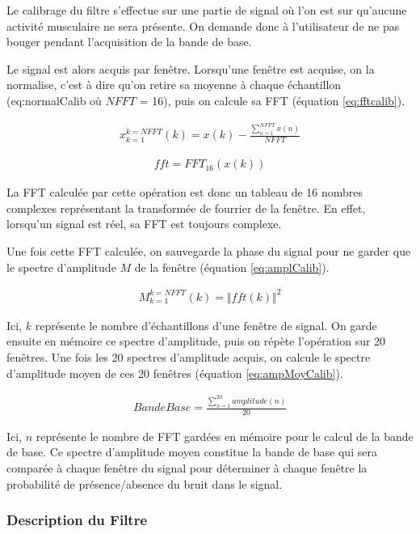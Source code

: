 \documentclass[letterpaper, twoside, 12pt, memoire, creativecommons, hyperref]{thETS}
\begin{document}
Le calibrage du filtre s'effectue sur une partie de signal où l'on est sur qu'aucune activité musculaire ne sera présente. On demande donc à l'utilisateur de ne pas bouger pendant l'acquisition de la bande de base. 

Le signal est alors acquis par fenêtre. Lorsqu'une fenêtre est acquise, on la normalise, c'est à dire qu'on retire sa moyenne à chaque échantillon (eq:normalCalib où $NFFT$ = 16), puis on calcule sa FFT (équation \ref{eq:fftcalib}).

\begin{align}\label{eq:normalCalib}
   x_{k=1}^{k=NFFT}(k) = x(k) - \frac{\sum_{n=1}^{NFFT}x(n)}{NFFT}
\end{align}

\begin{align}\label{eq:fftcalib}
   fft = FFT_{16}(x(k)) 
\end{align}

La FFT calculée par cette opération est donc un tableau de 16 nombres complexes représentant la transformée de fourrier de la fenêtre. En effet, lorsqu'un signal est réel, sa FFT est toujours complexe.

Une fois cette FFT calculée, on sauvegarde la phase du signal pour ne garder que le spectre d'amplitude $M$ de la fenêtre (équation \ref{eq:amplCalib}).

\begin{align}\label{eq:amplCalib}
   M_{k=1}^{k=NFFT}(k) = \Vert fft(k) \Vert^2
\end{align}

Ici, $k$ représente le nombre d'échantillons d'une fenêtre de signal. On garde ensuite en mémoire ce spectre d'amplitude, puis on répète l'opération sur 20 fenêtres. Une fois les 20 spectres d'amplitude acquis, on calcule le spectre d'amplitude moyen de ces 20 fenêtres (équation \ref{eq:ampMoyCalib}).

\begin{align}\label{eq:ampMoyCalib}
   BandeBase = \frac{\sum_{n=1}^{20}amplitude(n)}{20}
\end{align}

Ici, $n$ représente le nombre de FFT gardées en mémoire pour le calcul de la bande de base. Ce spectre d'amplitude moyen constitue la bande de base qui sera comparée à chaque fenêtre du signal pour déterminer à chaque fenêtre la probabilité de présence/absence du bruit dans le signal.

\subsubsection{Description du Filtre}
\end{document}
